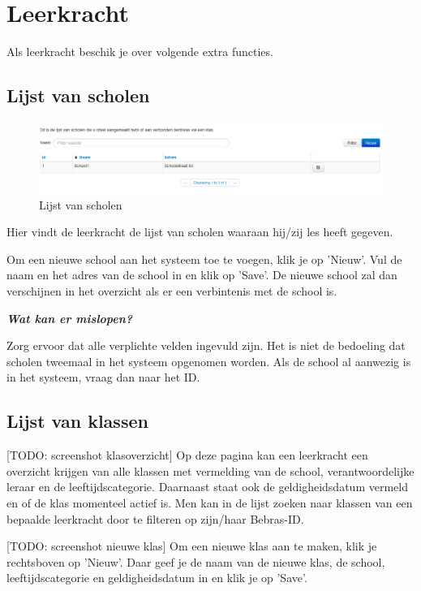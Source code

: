 \documentclass[]{article}
\begin{document}
\section{Leerkracht}

Als leerkracht beschik je over volgende extra functies.

\subsection{Lijst van scholen}

\begin{figure}[!ht]
	\centering
	\includegraphics[width=1\textwidth]{img/schools}
	\caption{Lijst van scholen}
	\label{schools}
\end{figure}

Hier vindt de leerkracht de lijst van scholen waaraan hij/zij les heeft gegeven.

Om een nieuwe school aan het systeem toe te voegen, klik je op 'Nieuw'. Vul de naam en het adres van de school in en klik op 'Save'. De nieuwe school zal dan verschijnen in het overzicht als er een verbintenis met de school is.

\textbf{\textit{Wat kan er mislopen?}}

Zorg ervoor dat alle verplichte velden ingevuld zijn. Het is niet de bedoeling dat scholen tweemaal in het systeem opgenomen worden. Als de school al aanwezig is in het systeem, vraag dan naar het ID.

\subsection{Lijst van klassen}

[TODO: screenshot klasoverzicht]
Op deze pagina kan een leerkracht een overzicht krijgen van alle klassen met vermelding van de school, verantwoordelijke leraar en de leeftijdscategorie. Daarnaast staat ook de geldigheidsdatum vermeld en of de klas momenteel actief is.
Men kan in de lijst zoeken naar klassen van een bepaalde leerkracht door te filteren op zijn/haar Bebras-ID.

[TODO: screenshot nieuwe klas]
Om een nieuwe klas aan te maken, klik je rechtsboven op 'Nieuw'. Daar geef je de naam van de nieuwe klas, de school, leeftijdscategorie en geldigheidsdatum in en klik je op 'Save'.
\end{document}
